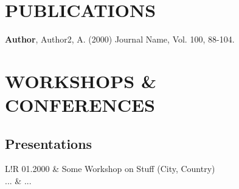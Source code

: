 \documentclass[10pt,a4paper]{article}
\newcommand\VRule{\color{lightgray}\vrule width 0.5pt} %
\begin{document}
\section*{\textbf{PUBLICATIONS}}

\textbf{Author}, Author2, A. (2000) Journal Name, Vol. 100, 88-104.\\

\section*{\textbf{WORKSHOPS \& CONFERENCES}}

\subsection*{Presentations}
\begin{tabular}{L!{\VRule}R}
01.2000 & Some Workshop on Stuff (City, Country)\\
... & ...\\
\end{tabular}
\end{document}
